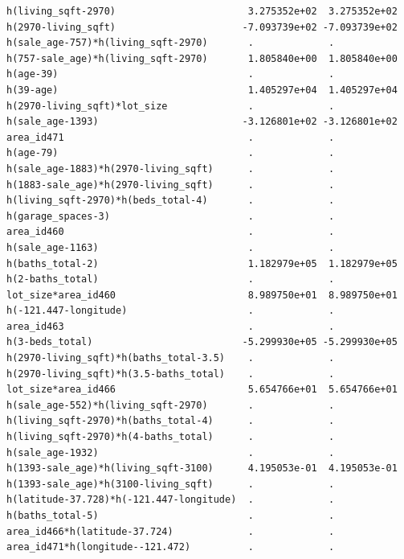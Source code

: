 \documentclass[
]{article}
\begin{document}
\begin{verbatim}
h(living_sqft-2970)                       3.275352e+02  3.275352e+02
h(2970-living_sqft)                      -7.093739e+02 -7.093739e+02
h(sale_age-757)*h(living_sqft-2970)       .             .           
h(757-sale_age)*h(living_sqft-2970)       1.805840e+00  1.805840e+00
h(age-39)                                 .             .           
h(39-age)                                 1.405297e+04  1.405297e+04
h(2970-living_sqft)*lot_size              .             .           
h(sale_age-1393)                         -3.126801e+02 -3.126801e+02
area_id471                                .             .           
h(age-79)                                 .             .           
h(sale_age-1883)*h(2970-living_sqft)      .             .           
h(1883-sale_age)*h(2970-living_sqft)      .             .           
h(living_sqft-2970)*h(beds_total-4)       .             .           
h(garage_spaces-3)                        .             .           
area_id460                                .             .           
h(sale_age-1163)                          .             .           
h(baths_total-2)                          1.182979e+05  1.182979e+05
h(2-baths_total)                          .             .           
lot_size*area_id460                       8.989750e+01  8.989750e+01
h(-121.447-longitude)                     .             .           
area_id463                                .             .           
h(3-beds_total)                          -5.299930e+05 -5.299930e+05
h(2970-living_sqft)*h(baths_total-3.5)    .             .           
h(2970-living_sqft)*h(3.5-baths_total)    .             .           
lot_size*area_id466                       5.654766e+01  5.654766e+01
h(sale_age-552)*h(living_sqft-2970)       .             .           
h(living_sqft-2970)*h(baths_total-4)      .             .           
h(living_sqft-2970)*h(4-baths_total)      .             .           
h(sale_age-1932)                          .             .           
h(1393-sale_age)*h(living_sqft-3100)      4.195053e-01  4.195053e-01
h(1393-sale_age)*h(3100-living_sqft)      .             .           
h(latitude-37.728)*h(-121.447-longitude)  .             .           
h(baths_total-5)                          .             .           
area_id466*h(latitude-37.724)             .             .           
area_id471*h(longitude--121.472)          .             .           
                                                                    

\end{verbatim}
\end{document}

